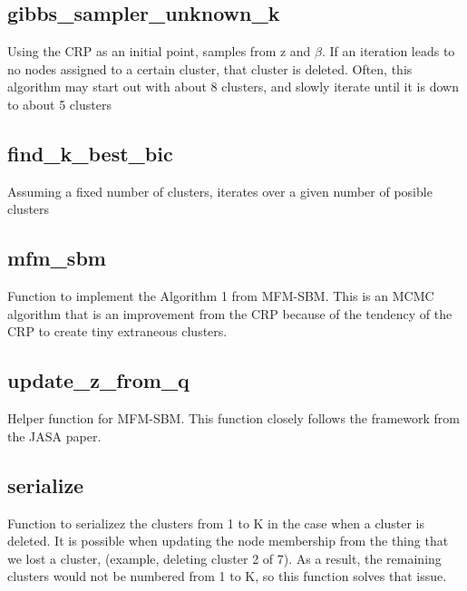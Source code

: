 \subsection*{gibbs_sampler_unknown_k}
Using the CRP as an initial point, samples from z and $\beta$. If an iteration leads to no nodes assigned to a certain cluster, that cluster is deleted. Often, this algorithm may start out with about 8 clusters, and slowly iterate until it is down to about 5 clusters
\subsection*{find_k_best_bic}
Assuming a fixed number of clusters, iterates over a given number of posible clusters
\subsection*{mfm_sbm}
Function to implement the Algorithm 1 from MFM-SBM. This is an MCMC algorithm that is an improvement from the CRP because of the tendency of the CRP to create tiny extraneous clusters.
\subsection*{update_z_from_q}
Helper function for MFM-SBM. This function closely follows the framework from the JASA paper.
\subsection*{serialize}
Function to serializez the clusters from 1 to K in the case when a cluster is deleted. It is possible when updating the node membership from the thing that we lost a cluster, (example, deleting cluster 2 of 7). As a result, the remaining clusters would not be numbered from 1 to K, so this function solves that issue.







